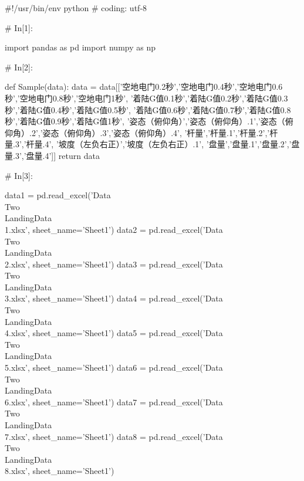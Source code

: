\documentclass{MathorCupModeling}
\begin{document}
\begin{python}
#!/usr/bin/env python
# coding: utf-8

# In[1]:


import pandas as pd
import numpy as np


# In[2]:


def Sample(data):
    data = data[['空地电门0.2秒','空地电门0.4秒','空地电门0.6秒','空地电门0.8秒','空地电门1秒',
                 '着陆G值0.1秒','着陆G值0.2秒','着陆G值0.3秒','着陆G值0.4秒','着陆G值0.5秒',
                 '着陆G值0.6秒','着陆G值0.7秒','着陆G值0.8秒','着陆G值0.9秒','着陆G值1秒',
                 '姿态（俯仰角）','姿态（俯仰角）.1','姿态（俯仰角）.2','姿态（俯仰角）.3','姿态（俯仰角）.4',
                 '杆量','杆量.1','杆量.2','杆量.3','杆量.4',
                 '坡度（左负右正）','坡度（左负右正）.1',
                 '盘量','盘量.1','盘量.2','盘量.3','盘量.4']]
    return data


# In[3]:


data1 = pd.read_excel('Data\\Two\\LandingData\\1.xlsx', sheet_name='Sheet1')
data2 = pd.read_excel('Data\\Two\\LandingData\\2.xlsx', sheet_name='Sheet1')
data3 = pd.read_excel('Data\\Two\\LandingData\\3.xlsx', sheet_name='Sheet1')
data4 = pd.read_excel('Data\\Two\\LandingData\\4.xlsx', sheet_name='Sheet1')
data5 = pd.read_excel('Data\\Two\\LandingData\\5.xlsx', sheet_name='Sheet1')
data6 = pd.read_excel('Data\\Two\\LandingData\\6.xlsx', sheet_name='Sheet1')
data7 = pd.read_excel('Data\\Two\\LandingData\\7.xlsx', sheet_name='Sheet1')
data8 = pd.read_excel('Data\\Two\\LandingData\\8.xlsx', sheet_name='Sheet1')



\end{python}
\end{document}
